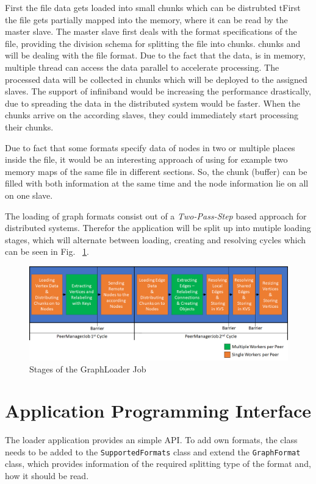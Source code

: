 First the file data gets loaded into small chunks which can be distrubted tFirst the file gets partially mapped into the memory, where it can be read by the master slave. The master slave first deals with the format specifications of the file, providing the division schema for splitting the file into chunks. chunks and will be dealing with the file format. Due to the fact that the data, is in memory, multiple thread can access the data parallel to accelerate processing. The processed data will be collected in chunks which will be deployed to the assigned slaves.
The support of infiniband would be increasing the performance drastically, due to spreading the data in the distributed system would be faster.
When the chunks arrive on the according slaves, they could immediately start processing their chunks.
 
Due to fact that some formats specify data of nodes in two or multiple places inside the file, it would be an interesting approach of using for example two memory maps of the same file in different sections. So, the chunk (buffer) can be filled with both information at the same time and the node information lie on all on one slave.

\newpage
The loading of graph formats consist out of a \textit{Two-Pass-Step} based approach for distributed systems. Therefor the application will be split up into mutiple loading stages, which will alternate between loading, creating and resolving cycles which can be seen in Fig. ~\ref{stages}.
\begin{figure}[H]
	\centering
	\includegraphics[width=1.0\linewidth]{img/schema_jobs.png}
	\caption{Stages of the GraphLoader Job}
	\label{stages}
\end{figure}

\section{Application Programming Interface}
The loader application provides an simple API. To add own formats, the class needs to be added to the \texttt{SupportedFormats} class and extend the \texttt{GraphFormat} class, which provides information of the required splitting type of the format and, how it should be read.
